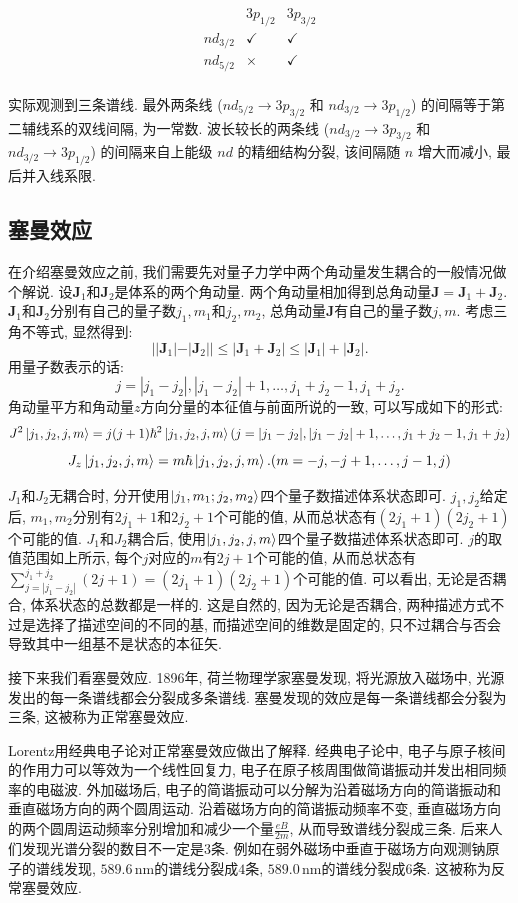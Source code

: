 \[
\begin{array}{c|cc}
 & 3p_{1/2} & 3p_{3/2} \\ \hline
n d_{3/2} & \checkmark & \checkmark \\
n d_{5/2} & \times      & \checkmark \\
\end{array}
\]

实际观测到三条谱线. 最外两条线 (\(n d_{5/2}\to 3p_{3/2}\) 和 \(n d_{3/2}\to 3p_{1/2}\)) 的间隔等于第二辅线系的双线间隔, 为一常数. 波长较长的两条线 (\(n d_{3/2}\to 3p_{3/2}\) 和 \(n d_{3/2}\to 3p_{1/2}\)) 的间隔来自上能级 \(n d\) 的精细结构分裂, 该间隔随 \(n\) 增大而减小, 最后并入线系限.

\subsection{塞曼效应}
在介绍塞曼效应之前, 我们需要先对量子力学中两个角动量发生耦合的一般情况做个解说. 设$\bm{J}_1$和$\bm{J}_2$是体系的两个角动量. 两个角动量相加得到总角动量$\bm{J}=\bm{J}_1+\bm{J}_2$. $\bm{J}_1$和$\bm{J}_2$分别有自己的量子数$j_1, m_1$和$j_2, m_2$, 总角动量$\bm{J}$有自己的量子数$j, m$. 考虑三角不等式, 显然得到:
\[
||\bm{J}_1|-|\bm{J}_2|| \leq | \bm{J}_1+\bm{J}_2 | \leq |\bm{J}_1|+|\bm{J}_2|.
\]
用量子数表示的话:
\[
j = |j_1-j_2|, |j_1-j_2|+1, \ldots, j_1+j_2-1, j_1+j_2.
\]
角动量平方和角动量$z$方向分量的本征值与前面所说的一致, 可以写成如下的形式:
\[
J^2 \ket{j_1, j_2, j, m} = j(j+1)\hbar^2 \ket{j_1, j_2, j, m} (j=|j_1-j_2|, |j_1-j_2|+1, \ldots, j_1+j_2-1, j_1+j_2)
\]
\[
J_z \ket{j_1, j_2, j, m} = m\hbar \ket{j_1, j_2, j, m}. (m=-j, -j+1, \ldots, j-1, j)
\]

$J_1$和$J_2$无耦合时, 分开使用$\ket{j_1, m_1;j_2, m_2}$四个量子数描述体系状态即可. $j_1, j_2$给定后, $m_1, m_2$分别有$2j_1+1$和$2j_2+1$个可能的值, 从而总状态有$(2j_1+1)(2j_2+1)$个可能的值. $J_1$和$J_2$耦合后, 使用$\ket{j_1, j_2, j, m}$四个量子数描述体系状态即可. $j$的取值范围如上所示, 每个$j$对应的$m$有$2j+1$个可能的值, 从而总状态有$\sum_{j=|j_1-j_2|}^{j_1+j_2} (2j+1) = (2j_1+1)(2j_2+1)$个可能的值. 可以看出, 无论是否耦合, 体系状态的总数都是一样的. 这是自然的, 因为无论是否耦合, 两种描述方式不过是选择了描述空间的不同的基, 而描述空间的维数是固定的, 只不过耦合与否会导致其中一组基不是状态的本征矢.

接下来我们看塞曼效应. 1896年, 荷兰物理学家塞曼发现, 将光源放入磁场中, 光源发出的每一条谱线都会分裂成多条谱线. 塞曼发现的效应是每一条谱线都会分裂为三条, 这被称为正常塞曼效应.

Lorentz用经典电子论对正常塞曼效应做出了解释. 经典电子论中, 电子与原子核间的作用力可以等效为一个线性回复力, 电子在原子核周围做简谐振动并发出相同频率的电磁波. 外加磁场后, 电子的简谐振动可以分解为沿着磁场方向的简谐振动和垂直磁场方向的两个圆周运动. 沿着磁场方向的简谐振动频率不变, 垂直磁场方向的两个圆周运动频率分别增加和减少一个量$\frac{eB}{2m}$, 从而导致谱线分裂成三条. 后来人们发现光谱分裂的数目不一定是$3$条. 例如在弱外磁场中垂直于磁场方向观测钠原子的谱线发现, $589.6\, \mathrm{nm}$的谱线分裂成$4$条, $589.0\, \mathrm{nm}$的谱线分裂成$6$条. 这被称为反常塞曼效应.

